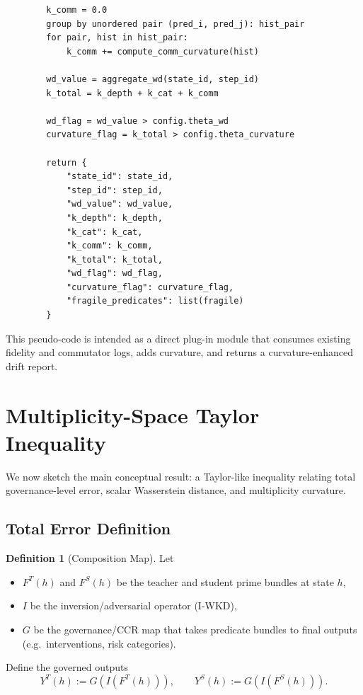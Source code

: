 \documentclass[11pt]{article}
\theoremstyle{definition}
\newtheorem{defn}{Definition}[section]
\theoremstyle{plain}
\theoremstyle{remark}
\begin{document}
\begin{verbatim}
        k_comm = 0.0
        group by unordered pair (pred_i, pred_j): hist_pair
        for pair, hist in hist_pair:
            k_comm += compute_comm_curvature(hist)

        wd_value = aggregate_wd(state_id, step_id)
        k_total = k_depth + k_cat + k_comm

        wd_flag = wd_value > config.theta_wd
        curvature_flag = k_total > config.theta_curvature

        return {
            "state_id": state_id,
            "step_id": step_id,
            "wd_value": wd_value,
            "k_depth": k_depth,
            "k_cat": k_cat,
            "k_comm": k_comm,
            "k_total": k_total,
            "wd_flag": wd_flag,
            "curvature_flag": curvature_flag,
            "fragile_predicates": list(fragile)
        }
\end{verbatim}

This pseudo-code is intended as a direct plug-in module that consumes existing fidelity and commutator logs, adds curvature, and returns a curvature-enhanced drift report.

\section{Multiplicity-Space Taylor Inequality}

We now sketch the main conceptual result: a Taylor-like inequality relating total governance-level error, scalar Wasserstein distance, and multiplicity curvature.

\subsection{Total Error Definition}

\begin{defn}[Composition Map]
Let
\begin{itemize}[leftmargin=2em]
  \item \(F^T(h)\) and \(F^S(h)\) be the teacher and student prime bundles at state \(h\),
  \item \(I\) be the inversion/adversarial operator (I-WKD),
  \item \(G\) be the governance/CCR map that takes predicate bundles to final outputs (e.g.\ interventions, risk categories).
\end{itemize}
Define the governed outputs
\[
  Y^T(h) := G(I(F^T(h))),
  \qquad
  Y^S(h) := G(I(F^S(h))).
\]
\end{defn}
\end{document}
